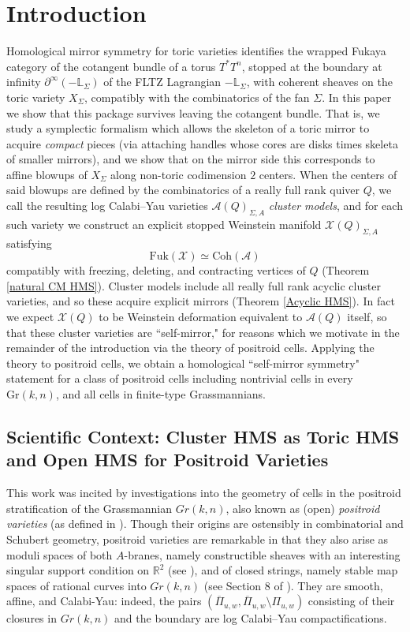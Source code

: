 \documentclass[11pt]{amsart}
\theoremstyle{definition}
\theoremstyle{remark}
\newcommand{\Coh}{\mathrm{Coh}}
\newcommand{\Fuk}{\mathrm{Fuk}}
\numberwithin{equation}{section}
\begin{document}
\section{Introduction}
Homological mirror symmetry for toric varieties identifies the wrapped Fukaya category of the cotangent bundle of a torus $T^*T^n$, stopped at the boundary at infinity $\partial^\infty (-\mathbb L_\Sigma)$ of the FLTZ Lagrangian $-\mathbb{L}_\Sigma$, with coherent sheaves on the toric variety $X_\Sigma$, compatibly with the combinatorics of the fan $\Sigma$. In this paper we show that this package survives leaving the cotangent bundle. That is, we study a symplectic formalism which allows the skeleton of a toric mirror to acquire \textit{compact} pieces (via attaching handles whose cores are disks times skeleta of smaller mirrors), and we show that on the mirror side this corresponds to affine blowups of $X_\Sigma$ along non-toric codimension $2$ centers. When the centers of said blowups are defined by the combinatorics of a really full rank quiver $Q$, we call the resulting log Calabi–Yau varieties $\mathcal A(Q)_{\Sigma,A}$ \textit{cluster models}, and for each such variety we construct an explicit stopped Weinstein manifold $\mathcal X(Q)_{\Sigma,A}$ satisfying $$\Fuk(\mathcal X)\simeq \Coh(\mathcal A)$$ \noindent compatibly with freezing, deleting, and contracting vertices of $Q$ (Theorem \ref{natural CM HMS}). Cluster models include all really full rank acyclic cluster varieties, and so these acquire explicit mirrors (Theorem \ref{Acyclic HMS}). In fact we expect $\mathcal X(Q)$ to be Weinstein deformation equivalent to $\mathcal A(Q)$ itself, so that these cluster varieties are ``self-mirror," for reasons which we motivate in the remainder of the introduction via the theory of positroid cells. Applying the theory to positroid cells, we obtain a homological ``self-mirror symmetry" statement for a class of positroid cells including nontrivial cells in every $\mathrm{Gr}(k,n)$, and all cells in finite-type Grassmannians.

\subsection{Scientific Context: Cluster HMS as Toric HMS and Open HMS for Positroid Varieties}

This work was incited by investigations into the geometry of cells in the positroid stratification of the Grassmannian $Gr(k,n)$, also known as (open) \textit{positroid varieties} (as defined in \cite{KLS}). Though their origins are ostensibly in combinatorial and Schubert geometry, positroid varieties are remarkable in that they also arise as moduli spaces of both $A$-branes, namely constructible sheaves with an interesting singular support condition on $\mathbb{R}^2$ (see \cite{STWZ}), and of closed strings, namely stable map spaces of rational curves into $Gr(k,n)$ (see Section 8 of \cite{KLS}). They are smooth, affine, and Calabi-Yau: indeed, the pairs $(\overline{\Pi}_{u,w}, \overline{\Pi}_{u,w}\setminus\Pi_{u,w})$ consisting of their closures in $Gr(k,n)$ and the boundary are log Calabi–Yau compactifications.\\
\end{document}
